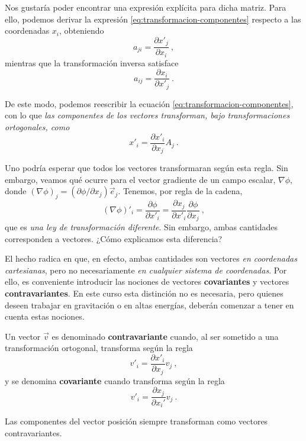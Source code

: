 Nos gustaría poder encontrar una expresión explícita para dicha matriz. Para ello, podemos derivar la expresión \eqref{eq:transformacion-componentes} respecto a las coordenadas $x_i$, obteniendo
\begin{equation}
    a_{ji} = \frac{\partial x'_j}{\partial x_i} \ ,
\end{equation}
mientras que la transformación inversa satisface
\begin{equation}
    a_{ij} = \frac{\partial x_i}{\partial x'_j} \ .
\end{equation}

De este modo, podemos reescribir la ecuación \eqref{eq:transformacion-componentes}, con lo que \emph{las componentes de los vectores transforman, bajo transformaciones ortogonales, como}
\begin{equation}
    x'_i = \frac{\partial x'_i}{\partial x_j} A_j \ .
\end{equation}

Uno podría esperar que todos los vectores transformaran según esta regla. Sin embargo, veamos qué ocurre para el vector gradiente de un campo escalar, $\nabla\phi$, donde $(\nabla \phi)_j = (\partial \phi/\partial x_j )\vec{e}_j$. Tenemos, por regla de la cadena,
\begin{equation}
    (\nabla \phi)'_i = \frac{\partial \phi}{\partial x'_i} = \frac{\partial x_j}{\partial x'_i} \frac{\partial \phi}{\partial x_j} \ ,
\end{equation}
que es \emph{una ley de transformación diferente}. Sin embargo, ambas cantidades corresponden a vectores. ¿Cómo explicamos esta diferencia?

El hecho radica en que, en efecto, ambas cantidades son vectores \emph{en coordenadas cartesianas}, pero no necesariamente \emph{en cualquier sistema de coordenadas}. Por ello, es conveniente introducir las nociones de vectores \textbf{covariantes} y vectores \textbf{contravariantes}. En este curso esta distinción no es necesaria, pero quienes deseen trabajar en gravitación o en altas energías, deberán comenzar a tener en cuenta estas nociones.

\begin{defi} 
    Un vector $\vec{v}$ es denominado \textbf{contravariante} cuando, al ser sometido a una transformación ortogonal, transforma según la regla
    \begin{equation} \label{eq:contravariante}
        v'_i = \frac{\partial x'_i}{\partial x_j} v_j \ ,
    \end{equation}
    y se denomina \textbf{covariante} cuando transforma según la regla
    \begin{equation} \label{eq:covariante}
        v'_i = \frac{\partial x_j}{\partial x_i'} v_j \ .
    \end{equation}

    Las componentes del vector posición siempre transforman como vectores contravariantes.
\end{defi}



